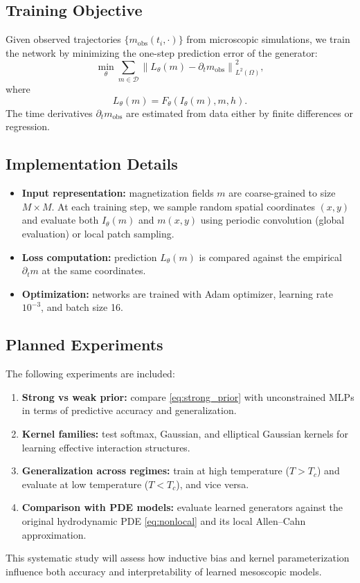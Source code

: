\documentclass[11pt,a4paper]{article}
\begin{document}
\subsection{Training Objective}
Given observed trajectories $\{m_{\text{obs}}(t_i,\cdot)\}$ from microscopic simulations, 
we train the network by minimizing the one-step prediction error of the generator:
\begin{equation}
\min_{\theta} \sum_{m \in \mathcal{D}} 
\left\| L_\theta(m) - \partial_t m_{\text{obs}} \right\|_{L^2(\Omega)}^2,
\label{eq:training}
\end{equation}
where 
\begin{equation}
L_\theta(m) = F_\theta(I_\theta(m), m, h).
\end{equation}
The time derivatives $\partial_t m_{\text{obs}}$ are estimated from data either by finite differences or regression.

\subsection{Implementation Details}
\begin{itemize}
  \item \textbf{Input representation:} magnetization fields $m$ are coarse-grained to size $M\times M$. 
  At each training step, we sample random spatial coordinates $(x,y)$ and evaluate both $I_\theta(m)$ and $m(x,y)$ using periodic convolution (global evaluation) or local patch sampling.
  \item \textbf{Loss computation:} prediction $L_\theta(m)$ is compared against the empirical $\partial_t m$ at the same coordinates.
  \item \textbf{Optimization:} networks are trained with Adam optimizer, learning rate $10^{-3}$, and batch size 16.
\end{itemize}

\subsection{Planned Experiments}
The following experiments are included:
\begin{enumerate}
  \item \textbf{Strong vs weak prior:} compare \eqref{eq:strong_prior} with unconstrained MLPs in terms of predictive accuracy and generalization.
  \item \textbf{Kernel families:} test softmax, Gaussian, and elliptical Gaussian kernels for learning effective interaction structures.
  \item \textbf{Generalization across regimes:} train at high temperature ($T > T_c$) and evaluate at low temperature ($T < T_c$), and vice versa.
  \item \textbf{Comparison with PDE models:} evaluate learned generators against the original hydrodynamic PDE \eqref{eq:nonlocal} and its local Allen–Cahn approximation.
\end{enumerate}
This systematic study will assess how inductive bias and kernel parameterization influence both accuracy and interpretability of learned mesoscopic models.
\end{document}
